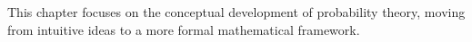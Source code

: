This chapter focuses on the conceptual development of probability theory, moving from intuitive ideas to a more formal mathematical framework.
